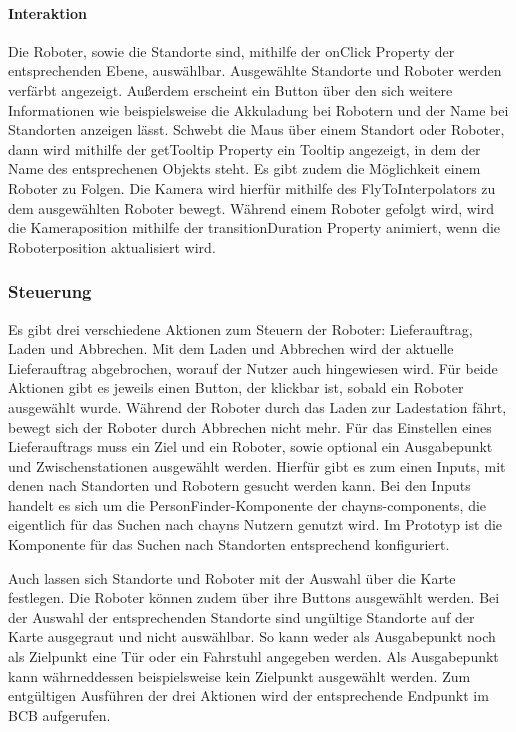 \paragraph{Interaktion}
Die Roboter, sowie die Standorte sind, mithilfe der onClick Property der entsprechenden Ebene, auswählbar.
Ausgewählte Standorte und Roboter werden verfärbt angezeigt. Außerdem erscheint ein Button über den sich weitere Informationen wie beispielsweise die Akkuladung bei Robotern und der Name bei Standorten anzeigen lässt. Schwebt die Maus über einem Standort oder Roboter, dann wird mithilfe der getTooltip Property ein Tooltip angezeigt, in dem der Name des entsprechenen Objekts steht.
Es gibt zudem die Möglichkeit einem Roboter zu Folgen. Die Kamera wird hierfür mithilfe des FlyToInterpolators zu dem ausgewählten Roboter bewegt. 
Während einem Roboter gefolgt wird, wird die Kameraposition mithilfe der transitionDuration Property animiert, wenn die Roboterposition aktualisiert wird.


\subsubsection{Steuerung}
Es gibt drei verschiedene Aktionen zum Steuern der Roboter: Lieferauftrag, Laden und Abbrechen. Mit dem Laden und Abbrechen wird der aktuelle Lieferauftrag abgebrochen, worauf der Nutzer auch hingewiesen wird. Für beide Aktionen gibt es jeweils einen Button, der klickbar ist, sobald ein Roboter ausgewählt wurde. Während der Roboter durch das Laden zur Ladestation fährt, bewegt sich der Roboter durch Abbrechen nicht mehr. Für das Einstellen eines Lieferauftrags muss ein Ziel und ein Roboter, sowie optional ein Ausgabepunkt und Zwischenstationen ausgewählt werden. Hierfür gibt es zum einen Inputs, mit denen nach Standorten und Robotern gesucht werden kann. Bei den Inputs handelt es sich um die PersonFinder-Komponente der chayns-components, die eigentlich für das Suchen nach chayns Nutzern genutzt wird. Im Prototyp ist die Komponente für das Suchen nach Standorten entsprechend konfiguriert.

Auch lassen sich Standorte und Roboter mit der Auswahl über die Karte festlegen. Die Roboter können zudem über ihre Buttons ausgewählt werden. Bei der Auswahl der entsprechenden Standorte sind ungültige Standorte auf der Karte ausgegraut und nicht auswählbar. So kann weder als Ausgabepunkt noch als Zielpunkt eine Tür oder ein Fahrstuhl angegeben werden. Als Ausgabepunkt kann währneddessen beispielsweise kein Zielpunkt ausgewählt werden. Zum entgültigen Ausführen der drei Aktionen wird der entsprechende Endpunkt im \ac{BCB} aufgerufen.

